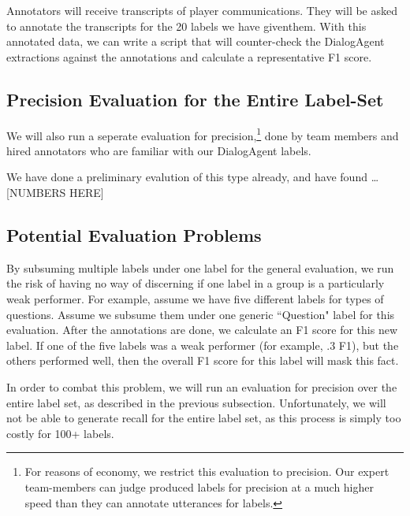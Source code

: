 Annotators will receive transcripts of player communications. They will be asked to annotate the transcripts for the 20 labels we have giventhem. With this annotated data, we can write a script that will counter-check the DialogAgent extractions against the annotations and calculate a representative F1 score.



\subsection{Precision Evaluation for the Entire Label-Set}
We will also run a seperate evaluation for precision,\footnote{For reasons of economy, we restrict this evaluation to precision. Our expert team-members can judge produced labels for precision at a much higher speed than they can annotate utterances for labels.} done by team members and hired annotators who are familiar with our DialogAgent labels.

We have done a preliminary evalution of this type already, and have found \ldots [NUMBERS HERE]

\subsection{Potential Evaluation Problems}
By subsuming multiple labels under one label for the general evaluation, we run the risk of having no way of discerning if one label in a group is a particularly weak performer. For example, assume we have five different labels for types of questions. Assume we subsume them under one generic ``Question" label for this evaluation. After the annotations are done, we calculate an F1 score for this new label. If one of the five labels was a weak performer (for example, .3 F1), but the others performed well, then the overall F1 score for this label will mask this fact. 

In order to combat this problem, we will run an evaluation for precision over the entire label set, as described in the previous subsection. Unfortunately, we will not be able to generate recall for the entire label set, as this process is simply too costly for 100+ labels.

